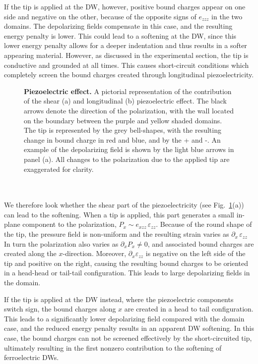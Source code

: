 If the tip is applied at the DW, however, positive bound charges appear on one side and negative on the other, because of the opposite signs of $e_{zzz}$ in the two domains.
The depolarizing fields compensate in this case, and the resulting energy penalty is lower.
This could lead to a softening at the DW, since this lower energy penalty allows for a deeper indentation and thus results in a softer appearing material.
However, as discussed in the experimental section, the tip is conductive and grounded at all times.
This causes short-circuit conditions which completely screen the bound charges created through longitudinal piezoelectricity.
\begin{figure}[h]
	\caption{\label{fig:BTO_depolarizing}{\bf Piezoelectric effect.} A pictorial representation of the contribution of the shear (a) and longitudinal (b) piezoelectric effect. The black arrows denote the direction of the polarization, with the wall located on the boundary between the purple and yellow shaded domains. The tip is represented by the grey bell-shapes, with the resulting change in bound charge in red and blue, and by the + and -. An example of the depolarizing field is shown by the light blue arrows in panel (a). All changes to the polarization due to the applied tip are exaggerated for clarity.}
\end{figure}
\\\\
We therefore look whether the shear part of the piezoelectricity (see Fig.~\ref{fig:BTO_depolarizing}(a)) can lead to the softening.
When a tip is applied, this part generates a small in-plane component to the polarization, $P_x \sim e_{xzz}\,\varepsilon_{zz}$.
Because of the round shape of the tip, the pressure field is non-uniform and the resulting strain varies as $\partial_x\,\varepsilon_{zz}$
In turn the polarization also varies as $\partial_x P_x\neq 0$, and associated bound charges are created along the $x$-direction.
Moreover, $\partial_x \varepsilon_{zz}$ is negative on the left side of the tip and positive on the right, causing the resulting bound charges to be oriented in a head-head or tail-tail configuration.
This leads to large depolarizing fields in the domain.

If the tip is applied at the DW instead, where the piezoelectric components switch sign, the bound charges along $x$ are created in a head to tail configuration.
This leads to a significantly lower depolarizing field compared with the domain case, and the reduced energy penalty results in an apparent DW softening.
In this case, the bound charges can not be screened effectively by the short-circuited tip, ultimately resulting in the first nonzero contribution to the softening of ferroelectric DWs. 

